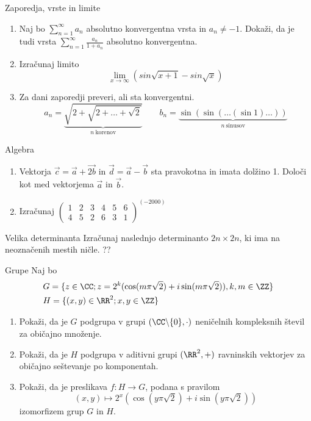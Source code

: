 \begin{frame}{Zaporedja, vrste in limite}
	\begin{enumerate}
		\item 
		Naj bo $\sum_{n=1}^{\infty} a_n$ absolutno konvergentna vrsta in $a_n \ne -1$.
		Dokaži, da je tudi vrsta $\sum_{n=1}^\infty \frac{a_n}{1+a_n}$
		absolutno konvergentna.

		\item
		Izračunaj limito
		$$\lim_{x\longrightarrow\infty}(sin\sqrt{x+1}-sin\sqrt{x})$$

		\item
		Za dani zaporedji preveri, ali sta konvergentni.
		$$
		a_n = \underbrace{\sqrt{2+\sqrt{2+\dots+\sqrt{2}}}}_{n~\text{korenov}} \qquad
		b_n = \underbrace{\sin(\sin(\dots(\sin 1)\dots))}_{n~\text{sinusov}}
		$$
		
	\end{enumerate}
\end{frame}

\begin{frame}{Algebra}
	\begin{enumerate}
		\item
		Vektorja $\vec{c} = \vec{a} + \vec{2b}$ in $\vec{d} = \vec{a} - \vec{b}$ 
		sta pravokotna in imata dolžino 1. Določi kot med vektorjema $\vec{a}$ in $\vec{b}$.
		\item 
		Izračunaj
		$ \begin{pmatrix}
	1 & 2 & 3 & 4 & 5 & 6\\
	4 & 5 & 2 & 6 & 3 & 1		
		\end{pmatrix} ^ (-2000) $
	\end{enumerate}
\end{frame}

\begin{frame}{Velika determinanta}
	Izračunaj naslednjo determinanto $2n \times 2n$, ki ima na neoznačenih mestih ničle.
	??
\end{frame}

\begin{frame}{Grupe}
	Naj bo
	\begin{align*}
	 &G = \{ z \in \CC; z = 2^k (\cos(m\pi \sqrt{2}) + i \sin(m\pi\sqrt{2})),k,m \in \ZZ \} \\
	 &H = \{ (x,y) \in \RR^2; x,y \in \ZZ \} 
	\end{align*}
	\begin{enumerate}
		\item
			Pokaži, da je $G$ podgrupa v grupi $ (\CC \backslash \{0\}, \cdot)$
			neničelnih kompleksnih števil za običajno množenje.
		\item
			Pokaži, da je $H$ podgrupa v aditivni grupi $(\RR^2, +)$
			ravninskih vektorjev za običajno seštevanje po komponentah.
		\item
			Pokaži, da je preslikava $f:H\to G$, podana s pravilom
			$$ (x,y) \mapsto 2^x(\cos(y\pi\sqrt{2})+i \sin(y\pi\sqrt{2})) $$
			izomorfizem grup $G$ in $H$.
	\end{enumerate}
\end{frame}
